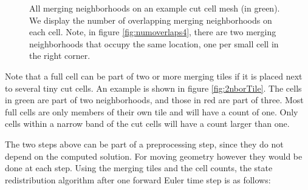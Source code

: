 \begin{itemize}
\begin{figure}
	\caption{All merging neighborhoods on an example cut cell mesh (in green).  We display the number of overlapping merging neighborhoods on each cell. Note, in figure \ref{fig:numoverlaps4}, there are two merging neighborhoods that occupy the same location, one per small cell in the right corner.} \label{fig:overlappingneighs}
\end{figure}
Note that a full cell
can be part of two or more merging tiles if it is placed next to 
several tiny cut cells. An example is shown in
figure \ref{fig:2nborTile}. The cells in green are part of two
neighborhoods, and those in red are part of three.   
 Most full
cells are only members of their own tile and will have a count of one.
Only cells within a narrow band of the cut cells will have a count
larger than one.


\end{itemize}




The two steps above can be part of a preprocessing step, since they do not
depend on the computed solution. For moving geometry however they would
be done at each step.
Using the merging tiles and the cell counts, the state redistribution
algorithm after one forward Euler time step is as follows:

